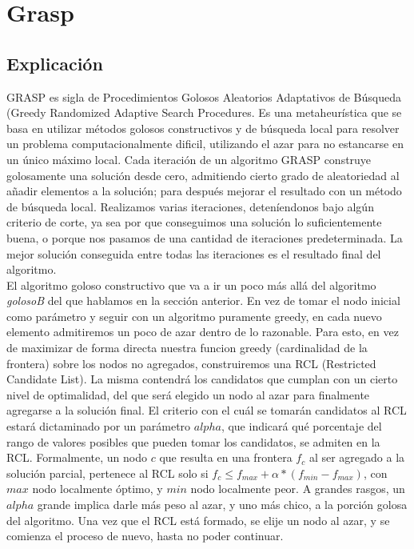 \section{Grasp}

\subsection{Explicación}
GRASP es sigla de Procedimientos Golosos Aleatorios Adaptativos de Búsqueda (Greedy Randomized Adaptive Search Procedures. Es una metaheurística que se basa en utilizar métodos golosos constructivos y de búsqueda local para resolver un problema computacionalmente dificil, utilizando el azar para no estancarse en un único máximo local. Cada iteración de un algoritmo GRASP construye golosamente una solución desde cero, admitiendo cierto grado de aleatoriedad al añadir elementos a la solución; para después mejorar el resultado con un método de búsqueda local. Realizamos varias iteraciones, deteníendonos bajo algún criterio de corte, ya sea por que conseguimos una solución lo suficientemente buena, o porque nos pasamos de una cantidad de iteraciones predeterminada. La mejor solución conseguida entre todas las iteraciones es el resultado final del algoritmo. \\

El algoritmo goloso constructivo que va a ir un poco más allá del algoritmo \textit{golosoB} del que hablamos en la sección anterior. En vez de tomar el nodo inicial como parámetro y seguir con un algoritmo puramente greedy, en cada nuevo elemento admitiremos un poco de azar dentro de lo razonable. Para esto, en vez de maximizar de forma directa nuestra funcion greedy (cardinalidad de la frontera) sobre los nodos no agregados, construiremos una RCL (Restricted Candidate List). La misma contendrá los candidatos que cumplan con un cierto nivel de optimalidad, del que será elegido un nodo al azar para finalmente agregarse a la solución final. El criterio con el cuál se tomarán candidatos al RCL estará dictaminado por un parámetro $alpha$, que indicará qué porcentaje del rango de valores posibles que pueden tomar los candidatos, se admiten en la RCL. Formalmente, un nodo $c$ que resulta en una frontera $f_c$ al ser agregado a la solución parcial, pertenece al RCL solo si $f_c \leq f_{max} + \alpha * (f_{min} - f_{max})$, con $max$ nodo localmente óptimo, y $min$ nodo localmente peor. A grandes rasgos, un $alpha$ grande implica darle más peso al azar, y uno más chico, a la porción golosa del algoritmo. Una vez que el RCL está formado, se elije un nodo al azar, y se comienza el proceso de nuevo, hasta no poder continuar. \\

